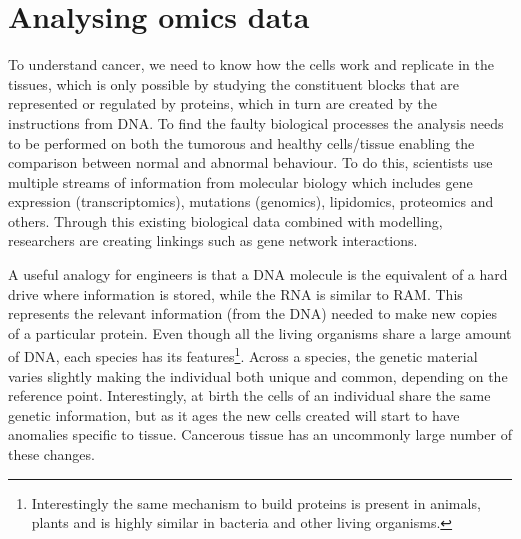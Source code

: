 
\section{Analysing omics data} \label{s:lit:multi-omics}


To understand cancer, we need to know how the cells work and replicate in the tissues, which is only possible by studying the constituent blocks that are represented or regulated by proteins, which in turn are created by the instructions from DNA. To find the faulty biological processes the analysis needs to be performed on both the tumorous and healthy cells/tissue enabling the comparison between normal and abnormal behaviour. To do this, scientists use multiple streams of information from molecular biology which includes gene expression (transcriptomics), mutations (genomics), lipidomics, proteomics and others. Through this existing biological data combined with modelling, researchers are creating linkings such as gene network interactions. 




A useful analogy for engineers is that a DNA molecule is the equivalent of a hard drive where information is stored, while the RNA is similar to RAM. This represents the relevant information (from the DNA) needed to make new copies of a particular protein. Even though all the living organisms share a large amount of DNA, each species has its features\footnote{Interestingly the same mechanism to build proteins is present in animals, plants and is highly similar in bacteria and other living organisms.}. Across a species, the genetic material varies slightly making the individual both unique and common, depending on the reference point. Interestingly, at birth the cells of an individual share the same genetic information, but as it ages the new cells created will start to have anomalies specific to tissue. Cancerous tissue has an uncommonly large number of these changes.


